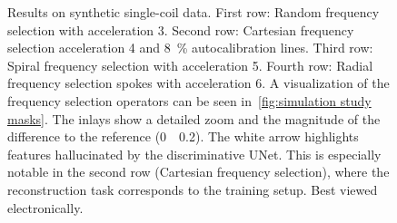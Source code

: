 \begin{figure}
	\tikzexternalenable%
	\caption[Qualitative results for the synthetic experiments]{%
		Results on synthetic single-coil data.
		First row:
		Random frequency selection with acceleration \num{3}.
		Second row:
		Cartesian frequency selection acceleration \num{4} and \qty{8}{\percent} autocalibration lines.
		Third row:
		Spiral frequency selection with acceleration \num{5}.
		Fourth row:
		Radial frequency selection spokes with acceleration \num{6}.
		A visualization of the frequency selection operators can be seen in~\cref{fig:simulation study masks}.
		The inlays show a detailed zoom and the magnitude of the difference to the reference (\num{0}~\protect\drawcolorbar~\num{0.2}).
		The white arrow highlights features hallucinated by the discriminative UNet.
		This is especially notable in the second row (Cartesian frequency selection), where the reconstruction task corresponds to the training setup.
		Best viewed electronically.
	}%
	\label{fig:simulation study}
\end{figure}
